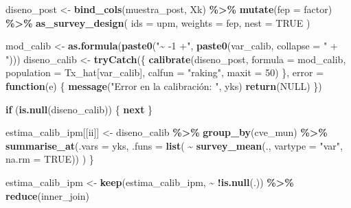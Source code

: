\documentclass[
  12pt,
]{book}
\newenvironment{Shaded}{\begin{snugshade}}{\end{snugshade}}
\newcommand{\AttributeTok}[1]{\textcolor[rgb]{0.13,0.29,0.53}{#1}}
\newcommand{\ConstantTok}[1]{\textcolor[rgb]{0.56,0.35,0.01}{#1}}
\newcommand{\ControlFlowTok}[1]{\textcolor[rgb]{0.13,0.29,0.53}{\textbf{#1}}}
\newcommand{\DecValTok}[1]{\textcolor[rgb]{0.00,0.00,0.81}{#1}}
\newcommand{\FunctionTok}[1]{\textcolor[rgb]{0.13,0.29,0.53}{\textbf{#1}}}
\newcommand{\NormalTok}[1]{#1}
\newcommand{\OtherTok}[1]{\textcolor[rgb]{0.56,0.35,0.01}{#1}}
\newcommand{\SpecialCharTok}[1]{\textcolor[rgb]{0.81,0.36,0.00}{\textbf{#1}}}
\newcommand{\StringTok}[1]{\textcolor[rgb]{0.31,0.60,0.02}{#1}}
\begin{document}
\begin{Shaded}
\begin{Highlighting}[]
\NormalTok{      diseno\_post }\OtherTok{\textless{}{-}} \FunctionTok{bind\_cols}\NormalTok{(muestra\_post, Xk) }\SpecialCharTok{\%\textgreater{}\%}
        \FunctionTok{mutate}\NormalTok{(}\AttributeTok{fep =}\NormalTok{ factor) }\SpecialCharTok{\%\textgreater{}\%}
        \FunctionTok{as\_survey\_design}\NormalTok{(}
          \AttributeTok{ids =}\NormalTok{ upm,}
          \AttributeTok{weights =}\NormalTok{ fep,}
          \AttributeTok{nest =} \ConstantTok{TRUE}
\NormalTok{        )}
      
\NormalTok{      mod\_calib }\OtherTok{\textless{}{-}} \FunctionTok{as.formula}\NormalTok{(}\FunctionTok{paste0}\NormalTok{(}\StringTok{"\textasciitilde{} {-}1 +"}\NormalTok{, }\FunctionTok{paste0}\NormalTok{(var\_calib, }\AttributeTok{collapse =} \StringTok{" + "}\NormalTok{)))}
\NormalTok{      diseno\_calib }\OtherTok{\textless{}{-}} \FunctionTok{tryCatch}\NormalTok{(\{}
        \FunctionTok{calibrate}\NormalTok{(diseno\_post, }\AttributeTok{formula =}\NormalTok{ mod\_calib, }
                  \AttributeTok{population =}\NormalTok{ Tx\_hat[var\_calib], }\AttributeTok{calfun =} \StringTok{"raking"}\NormalTok{,}
                  \AttributeTok{maxit =} \DecValTok{50}\NormalTok{)}
\NormalTok{      \}, }\AttributeTok{error =} \ControlFlowTok{function}\NormalTok{(e) \{}
        \FunctionTok{message}\NormalTok{(}\StringTok{"Error en la calibración: "}\NormalTok{, yks)}
        \FunctionTok{return}\NormalTok{(}\ConstantTok{NULL}\NormalTok{)}
\NormalTok{      \})}
      
      \ControlFlowTok{if}\NormalTok{ (}\FunctionTok{is.null}\NormalTok{(diseno\_calib)) \{}
        \ControlFlowTok{next}
\NormalTok{      \}}
      
\NormalTok{      estima\_calib\_ipm[[ii]] }\OtherTok{\textless{}{-}}\NormalTok{ diseno\_calib }\SpecialCharTok{\%\textgreater{}\%} \FunctionTok{group\_by}\NormalTok{(cve\_mun) }\SpecialCharTok{\%\textgreater{}\%}
        \FunctionTok{summarise\_at}\NormalTok{(}\AttributeTok{.vars =}\NormalTok{ yks, }\AttributeTok{.funs =} \FunctionTok{list}\NormalTok{(}
          \SpecialCharTok{\textasciitilde{}} \FunctionTok{survey\_mean}\NormalTok{(., }\AttributeTok{vartype =} \StringTok{"var"}\NormalTok{, }\AttributeTok{na.rm =} \ConstantTok{TRUE}\NormalTok{))}
\NormalTok{        )}
\NormalTok{    \}}
    
\NormalTok{    estima\_calib\_ipm }\OtherTok{\textless{}{-}} \FunctionTok{keep}\NormalTok{(estima\_calib\_ipm, }\SpecialCharTok{\textasciitilde{}} \SpecialCharTok{!}\FunctionTok{is.null}\NormalTok{(.)) }\SpecialCharTok{\%\textgreater{}\%}
      \FunctionTok{reduce}\NormalTok{(inner\_join)}
    

\end{Highlighting}
\end{Shaded}
\end{document}
